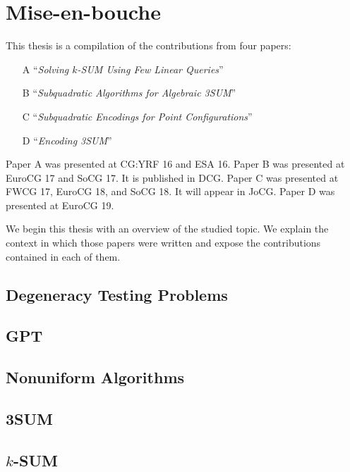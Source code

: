 \chapter{Mise-en-bouche}



This thesis is a compilation of the contributions from four papers:
%
\begin{enumerate}
	\item[A] ``\emph{Solving \(k\)-SUM Using Few Linear Queries}''~\cite{CIO16}
	\item[B] ``\emph{Subquadratic Algorithms for Algebraic 3SUM}''~\cite{BCILOS19}
	\item[C] ``\emph{Subquadratic Encodings for Point Configurations}''~\cite{CCILO19}
	\item[D] ``\emph{Encoding 3SUM}''~\cite{CCILMO19}
\end{enumerate}
%
Paper A was presented at CG:YRF 16 and ESA 16.
%
Paper B was presented at EuroCG 17 and SoCG 17. It is published in DCG.
%
Paper C was presented at FWCG 17, EuroCG 18, and SoCG 18. It will appear in JoCG.
%
Paper D was presented at EuroCG 19.

We begin this thesis with an overview of the studied topic.
%
We explain the context in which those papers were written and expose
the contributions contained in each of them.

\section*{Degeneracy Testing Problems}


\section*{GPT}


\section*{Nonuniform Algorithms}


\section*{3SUM}


\section*{\(k\)-SUM}

